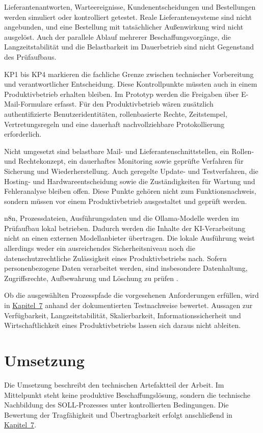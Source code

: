 \documentclass[a4paper,12pt]{article}
\begin{document}
Lieferantenantworten, Warteereignisse, Kundenentscheidungen und Bestellungen werden simuliert oder kontrolliert getestet. Reale Lieferantensysteme sind nicht angebunden, und eine Bestellung mit tatsächlicher Außenwirkung wird nicht ausgelöst. Auch der parallele Ablauf mehrerer Beschaffungsvorgänge, die Langzeitstabilität und die Belastbarkeit im Dauerbetrieb sind nicht Gegenstand des Prüfaufbaus.

KP1 bis KP4 markieren die fachliche Grenze zwischen technischer Vorbereitung und verantwortlicher Entscheidung. Diese Kontrollpunkte müssten auch in einem Produktivbetrieb erhalten bleiben. Im Prototyp werden die Freigaben über E-Mail-Formulare erfasst. Für den Produktivbetrieb wären zusätzlich authentifizierte Benutzeridentitäten, rollenbasierte Rechte, Zeitstempel, Vertretungsregeln und eine dauerhaft nachvollziehbare Protokollierung erforderlich.

Nicht umgesetzt sind belastbare Mail- und Lieferantenschnittstellen, ein Rollen- und Rechtekonzept, ein dauerhaftes Monitoring sowie geprüfte Verfahren für Sicherung und Wiederherstellung. Auch geregelte Update- und Testverfahren, die Hosting- und Hardwareentscheidung sowie die Zuständigkeiten für Wartung und Fehleranalyse bleiben offen. Diese Punkte gehören nicht zum Funktionsnachweis, sondern müssen vor einem Produktivbetrieb ausgestaltet und geprüft werden.

n8n, Prozessdateien, Ausführungsdaten und die Ollama-Modelle werden im Prüfaufbau lokal betrieben. Dadurch werden die Inhalte der KI-Verarbeitung nicht an einen externen Modellanbieter übertragen. Die lokale Ausführung weist allerdings weder ein ausreichendes Sicherheitsniveau noch die datenschutzrechtliche Zulässigkeit eines Produktivbetriebs nach. Sofern personenbezogene Daten verarbeitet werden, sind insbesondere Datenhaltung, Zugriffsrechte, Aufbewahrung und Löschung zu prüfen \parencite{eu_dsgvo_2016}.

Ob die ausgewählten Prozesspfade die vorgesehenen Anforderungen erfüllen, wird in \hyperref[sec:evaluation]{Kapitel~7} anhand der dokumentierten Testnachweise bewertet. Aussagen zur Verfügbarkeit, Langzeitstabilität, Skalierbarkeit, Informationssicherheit und Wirtschaftlichkeit eines Produktivbetriebs lassen sich daraus nicht ableiten.

\clearpage
\section{Umsetzung}
\label{sec:umsetzung}
Die Umsetzung beschreibt den technischen Artefaktteil der Arbeit. Im Mittelpunkt steht keine produktive Beschaffungslösung, sondern die technische Nachbildung des SOLL-Prozesses unter kontrollierten Bedingungen. Die Bewertung der Tragfähigkeit und Übertragbarkeit erfolgt anschließend in \hyperref[sec:evaluation]{Kapitel~7}.
\end{document}
